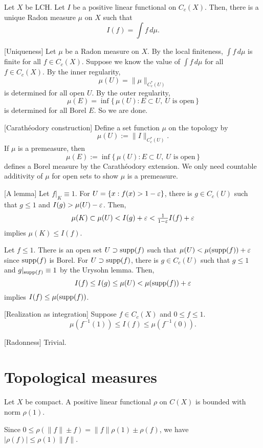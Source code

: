 \documentclass{../note}
\begin{document}
\begin{thm}
Let $X$ be LCH.
Let $I$ be a positive linear functional on $C_c(X)$.
Then, there is a unique Radon measure $\mu$ on $X$ such that
\[I(f)=\int f\,d\mu.\]
\end{thm}
\begin{pf}
[Uniqueness]
Let $\mu$ be a Radon measure on $X$.
By the local finiteness, $\int f\,d\mu$ is finite for all $f\in C_c(X)$.
Suppose we know the value of $\int f\,d\mu$ for all $f\in C_c(X)$.
By the inner regularity,
\[\mu(U)=\|\mu\|_{C_c^*(U)}\]
is determined for all open $U$.
By the outer regularity,
\[\mu(E)=\inf\{\,\mu(U):E\subset U,\ U\text{ is open}\,\}\]
is determined for all Borel $E$.
So we are done.

[Carath\'eodory construction]
Define a set function $\mu$ on the topology by
\[\mu(U):=\|I\|_{C_c^*(U)}.\]
If $\mu$ is a premeasure, then
\[\mu(E):=\inf\{\,\mu(U):E\subset U,\ U\text{ is open}\,\}\]
defines a Borel measure by the Carath\'eodory extension.
We only need countable additivity of $\mu$ for open sets to show $\mu$ is a premeasure.

[A lemma]
Let $f|_K\equiv1$.
For $U=\{x:f(x)>1-\varepsilon\}$, there is $g\in C_c(U)$ such that $g\le1$ and $I(g)>\mu(U)-\varepsilon$.
Then,
\[\mu(K)\subset\mu(U)<I(g)+\varepsilon<\tfrac1{1-\varepsilon}I(f)+\varepsilon\]
implies $\mu(K)\le I(f)$.

Let $f\le1$.
There is an open set $U\supset\operatorname{supp}(f)$ such that $\mu(U)<\mu(\operatorname{supp}(f))+\varepsilon$ since $\operatorname{supp}(f)$ is Borel.
For $U\supset\operatorname{supp}(f)$, there is $g\in C_c(U)$ such that $g\le1$ and $g|_{\operatorname{supp}(f)}\equiv1$ by the Urysohn lemma.
Then,
\[I(f)\le I(g)\le\mu(U)<\mu(\operatorname{supp}(f))+\varepsilon\]
implies $I(f)\le\mu(\operatorname{supp}(f))$.

[Realization as integration]
Suppose $f\in C_c(X)$ and $0\le f\le1$.
\[\mu(f^{-1}(1))\le I(f)\le\mu(f^{-1}(0)).\]


[Radonness]
Trivial.


\end{pf}

\section{Topological measures}
\begin{prb}
Let $X$ be compact.
A positive linear functional $\rho$ on $C(X)$ is bounded with norm $\rho(1)$.
\end{prb}
\begin{pf}
Since $0\le\rho(\|f\|\pm f)=\|f\|\rho(1)\pm\rho(f)$, we have $|\rho(f)|\le\rho(1)\|f\|$.
\end{pf}
\end{document}
